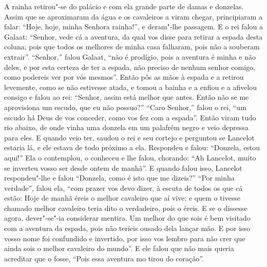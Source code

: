 A rainha retirou"-se do palácio e com ela grande parte de damas e donzelas. Assim
que se aproximaram da água e os cavaleiros a viram chegar, principiaram a falar:
“Hoje, hoje, minha Senhora rainha!”, e deram"-lhe passagem. E o rei falou a
Galaat: “Senhor, vede cá a aventura, da qual vos disse para retirar a espada
desta coluna; pois que todos os melhores de minha casa falharam, pois não a
souberam extrair”. “Senhor,” falou Galaat, “não é prodígio, pois a aventura é
minha e não deles, e por esta certeza de ter a espada, não preciso de nenhum
senhor comigo, como podereis ver por vós mesmos”. Então pôs as mãos à
espada e a retirou levemente, como se não estivesse atada, e tomou a bainha e a
enfiou e a afivelou consigo e falou ao rei: “Senhor, assim está melhor que
antes. Então não se me aprovisiona um escudo, que eu não possuo?” “Caro
Senhor,” falou o rei, “um escudo há Deus de vos conceder, como vos fez com a
espada”. Então viram tudo rio abaixo, de onde vinha uma donzela em um palafrém
negro e veio depressa para eles. E quando veio ter, saudou o rei e seu cortejo
e perguntou se Lancelot estaria lá, e ele estava de todo próximo a ela.
Respondeu e falou: “Donzela, estou aqui!” Ela o contemplou, o conheceu e lhe
falou, chorando: “Ah Lancelot, muito se inverteu vosso ser desde ontem de
manhã”. E quando falou isso, Lancelot respondeu"-lhe e falou “Donzela, como é
isto que me dizeis?” “Por minha verdade”, falou ela, “com prazer vos devo
dizer, à escuta de todos os que cá estão: Hoje de manhã éreis o melhor
cavaleiro que aí vive; e quem o tivesse chamado melhor cavaleiro teria dito o
verdadeiro, pois o éreis. E se o dissesse agora, dever"-se"-ia considerar
mentira. Um melhor do que sois é bem visitado com a aventura da espada, pois
não teríeis ousado dela lançar mão. E por isso vosso nome foi confundido e
invertido, por isso vos lembro para não crer que ainda sois o melhor cavaleiro
do mundo”. E ele falou que não mais queria acreditar que o fosse, “Pois essa
aventura mo tirou do coração”. 

